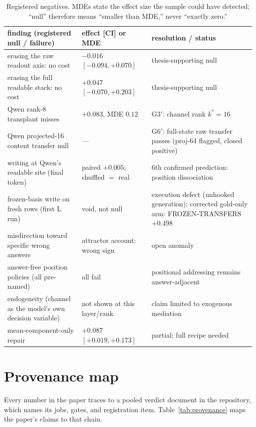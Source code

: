 \documentclass{article} %
\begin{document}
\begin{table}[h]
\centering\small
\begin{tabular}{@{}p{5.6cm}p{3.2cm}p{4.4cm}@{}}
\toprule
finding (registered null / failure) & effect [CI] or MDE & resolution / status \\
\midrule
erasing the raw readout axis: no cost & $-0.016$ $[-0.094,+0.070]$ & thesis-supporting null \\
erasing the full readable stack: no cost & $+0.047$ $[-0.070,+0.203]$ & thesis-supporting null \\
Qwen rank-8 transplant misses & $+0.083$, MDE $0.12$ & G3$'$: channel rank $k^{*}{=}16$ \\
Qwen projected-16 content transfer null & --- & G6$'$: full-state raw transfer passes (proj-64 flagged, closed positive) \\
writing at Qwen's readable site (final token) & paired $+0.005$; shuffled $=$ real & 6th confirmed prediction: position dissociation \\
frozen-basis write on fresh rows (first L run) & void, not null & execution defect (unhooked generation); corrected gold-only arm: FROZEN-TRANSFERS $+0.498$ \\
misdirection toward specific wrong answers & attractor account: wrong sign & open anomaly \\
answer-free position policies (all pre-named) & all fail & positional addressing remains answer-adjacent \\
endogeneity (channel as the model's own decision variable) & not shown at this layer/rank & claim limited to exogenous mediation \\
mean-component-only repair & $+0.087$ $[+0.019,+0.173]$ & partial; full recipe needed \\
\bottomrule
\end{tabular}
\caption{Registered negatives. MDEs state the effect size the sample
could have detected; ``null'' therefore means ``smaller than MDE,'' never
``exactly zero.''}
\label{tab:negatives}
\end{table}

\section{Provenance map}\label{app:provenance}

Every number in the paper traces to a pooled verdict document in the
repository, which names its jobs, gates, and registration item.
Table~\ref{tab:provenance} maps the paper's claims to that chain.
\end{document}
